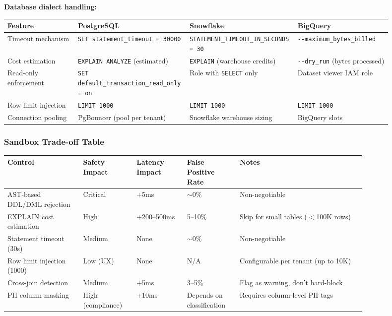 \textbf{Database dialect handling:}

\begin{tabular}{|p{0.18\linewidth}|p{0.24\linewidth}|p{0.24\linewidth}|p{0.24\linewidth}|}
\hline
\textbf{Feature} & \textbf{PostgreSQL} & \textbf{Snowflake} & \textbf{BigQuery} \\
\hline
Timeout mechanism & \texttt{SET statement\_timeout = 30000} & \texttt{STATEMENT\_TIMEOUT\_IN\_SECONDS = 30} & \texttt{-{}-maximum\_bytes\_billed} \\
\hline
Cost estimation & \texttt{EXPLAIN ANALYZE} (estimated) & \texttt{EXPLAIN} (warehouse credits) & \texttt{-{}-dry\_run} (bytes processed) \\
\hline
Read-only enforcement & \texttt{SET default\_transaction\_read\_only = on} & Role with \texttt{SELECT} only & Dataset viewer IAM role \\
\hline
Row limit injection & \texttt{LIMIT 1000} & \texttt{LIMIT 1000} & \texttt{LIMIT 1000} \\
\hline
Connection pooling & PgBouncer (pool per tenant) & Snowflake warehouse sizing & BigQuery slots \\
\hline
\end{tabular}

\subsubsection*{Sandbox Trade-off Table}

\begin{tabular}{|p{0.18\linewidth}|p{0.12\linewidth}|p{0.12\linewidth}|p{0.12\linewidth}|p{0.30\linewidth}|}
\hline
\textbf{Control} & \textbf{Safety Impact} & \textbf{Latency Impact} & \textbf{False Positive Rate} & \textbf{Notes} \\
\hline
AST-based DDL/DML rejection & Critical & +5ms & $\sim$0\% & Non-negotiable \\
\hline
EXPLAIN cost estimation & High & +200--500ms & 5--10\% & Skip for small tables ($<$100K rows) \\
\hline
Statement timeout (30s) & Medium & None & $\sim$0\% & Non-negotiable \\
\hline
Row limit injection (1000) & Low (UX) & None & N/A & Configurable per tenant (up to 10K) \\
\hline
Cross-join detection & Medium & +5ms & 3--5\% & Flag as warning, don't hard-block \\
\hline
PII column masking & High (compliance) & +10ms & Depends on classification & Requires column-level PII tags \\
\hline
\end{tabular}

